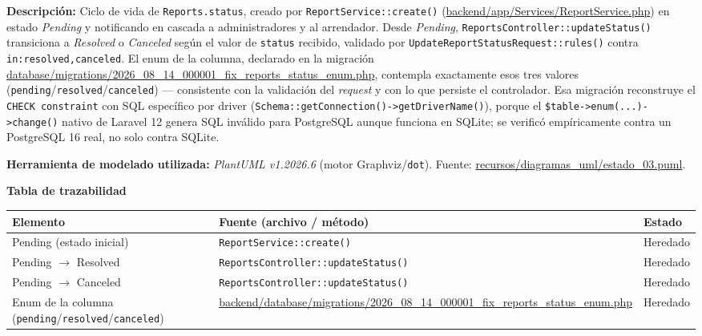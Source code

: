 {\sloppy\noindent\textbf{Descripción:} Ciclo de vida de \texttt{Reports.status}, creado por \texttt{ReportService::create()} (\url{backend/app/Services/ReportService.php}) en estado \emph{Pending} y notificando en cascada a administradores y al arrendador. Desde \emph{Pending}, \texttt{ReportsController::updateStatus()} transiciona a \emph{Resolved} o \emph{Canceled} según el valor de \texttt{status} recibido, validado por \texttt{UpdateReportStatusRequest::rules()} contra \texttt{in:resolved,canceled}. El enum de la columna, declarado en la migración \url{database/migrations/2026_08_14_000001_fix_reports_status_enum.php}, contempla exactamente esos tres valores (\texttt{pending}/\texttt{resolved}/\texttt{canceled}) --- consistente con la validación del \textit{request} y con lo que persiste el controlador. Esa migración reconstruye el \texttt{CHECK constraint} con SQL específico por driver (\texttt{Schema::getConnection()->getDriverName()}), porque el \texttt{\$table->enum(...)->change()} nativo de Laravel 12 genera SQL inválido para PostgreSQL aunque funciona en SQLite; se verificó empíricamente contra un PostgreSQL 16 real, no solo contra SQLite.\par}

\bigskip
{\sloppy\noindent\textbf{Herramienta de modelado utilizada:} \textit{PlantUML v1.2026.6} (motor Graphviz/\texttt{dot}). Fuente: \url{recursos/diagramas_uml/estado_03.puml}.\par}

\bigskip
\noindent\textbf{Tabla de trazabilidad}
\begin{longtable}{|L{4cm}|L{7.5cm}|M{2.3cm}|}
\hline
{} \textbf{Elemento} & \textbf{Fuente (archivo / método)} & \textbf{Estado} \\ \hline
\endhead
Pending (estado inicial) & \texttt{ReportService::create()} & Heredado \\ \hline
Pending $\to$ Resolved & \texttt{ReportsController::updateStatus()} & Heredado \\ \hline
Pending $\to$ Canceled & \texttt{ReportsController::updateStatus()} & Heredado \\ \hline
Enum de la columna (\texttt{pending}\slash\texttt{resolved}\slash\texttt{canceled}) & \url{backend/database/migrations/2026_08_14_000001_fix_reports_status_enum.php} & Heredado \\ \hline
\end{longtable}
\clearpage

